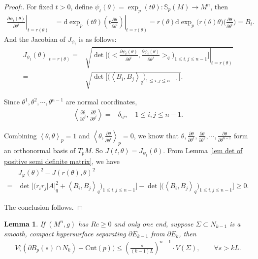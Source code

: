 \documentclass[11pt]{amsart}
\newtheorem{lemma}[theorem]{Lemma}
\numberwithin{equation}{section}
\renewcommand{\d}{\mathrm{d}}
\newcommand{\bracket}[1]{\ensuremath{\left<#1\right>}}
\begin{document}
\begin{proof}[Proof:]
For fixed $t> 0$, define $\displaystyle \psi_t(\theta)=\exp_p(t\theta): \mathbb{S}_p(M)\rightarrow M^n$,  then
    \begin{align*}
        \left.\frac{\partial \psi_t(\theta)}{\partial \theta^i}\right|_{t=r(\theta)}
       &=\left.\d\exp_p(t\theta)\left(t\frac{\partial \theta}{\partial \theta^i}\right)\right|_{t=r(\theta)}        =r(\theta)\d\exp_p\big(r(\theta)\theta\big)\bigg(\frac{\partial\theta}{\partial \theta^i}\bigg)=B_i.
    \end{align*} 
    And the Jacobian of $J_{\psi_t}$ is as follows:
    \begin{align*}
        J_{\psi_t}(\theta)|_{t=r(\theta)}=&\sqrt{\left.\det\Bigg[\Bigg(\Big<\frac{\partial \psi_t(\theta)}{\partial \theta^i},\frac{\partial \psi_t(\theta)}{\partial \theta^j}\Big>_q\Bigg)_{1\leq i,j\leq n-1}\Bigg]\right|_{t=r(\theta)}}\\
        =&\sqrt{\det\Big[\Big(\bracket{B_i,B_j}_q\Big)_{1\leq i,j\leq n-1}\Big]}.
    \end{align*}

Since $\theta^1,\theta^2,\cdots,\theta^{n-1}$ are normal coordinates, 
\begin{align*}
    \bracket{\frac{\partial \theta}{\partial \theta^i}, \frac{\partial \theta}{\partial \theta^j}}=&\delta_{ij},\quad 1\leq i, j\leq n-1. 
\end{align*}

Combining $\bracket{\theta,\theta}_p=1$ and $\bracket{\theta,\frac{\partial \theta}{\partial \theta^i}}_p=0$, we know that $\theta,\frac{\partial \theta}{\partial \theta^1}, \frac{\partial \theta}{\partial \theta^2},\cdots,\frac{\partial \theta}{\partial \theta^{n-1}}$ form an orthonormal basis of $T_pM$.  So $J(t,\theta)=J_{\psi_t}(\theta)$. From Lemma \ref{lem det of positive semi definite matrix}, we have
    \begin{align*}
        &J_\varphi(\theta)^2-J(r(\theta),\theta)^2\\
        =&\det\Big[\Big(r_ir_j |A|_q^2+\bracket{B_i,B_j}_q\Big)_{1\leq i,j\leq n-1}\Big]-\det\Big[\Big(\bracket{B_i,B_j}_q\Big)_{1\leq i,j\leq n-1}\Big]\geq 0.
    \end{align*}
    
The conclusion follows.
\end{proof}

\begin{lemma}\label{lem surface area comparison}
If $(M^n, g)$ has $Rc\geq 0$ and only one end,   suppose $\Sigma \subset  N_{k- 1}$ is a smooth, compact hypersurface separating $\partial E_{k- 1}$ from $\partial E_{k}$, then
\begin{align}
V\Big((\partial B_p(s)\cap N_k)- \mathrm{Cut}(p)\Big)\leq (\frac{s}{(k- 1)L})^{n- 1}\cdot V(\Sigma), \quad \quad \forall s> kL. \nonumber 
\end{align} 
\end{lemma}
\end{document}
